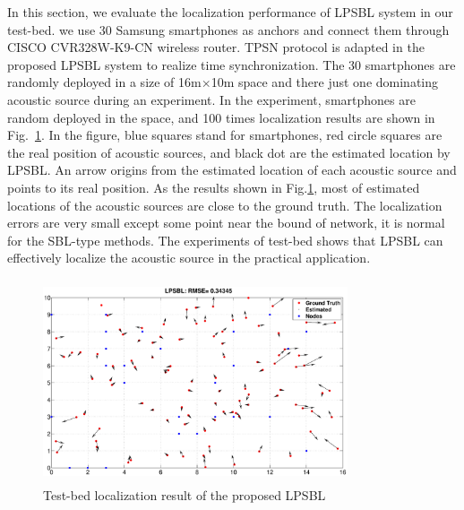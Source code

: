 In this section, we evaluate the localization performance of LPSBL system in our test-bed.
we use 30 Samsung smartphones as anchors and connect them through CISCO CVR328W-K9-CN wireless router. 
TPSN protocol is adapted in the proposed LPSBL system to realize time synchronization.
The 30 smartphones are randomly deployed in a size of 16m$\times$10m space and there just one dominating acoustic source during an experiment.
In the experiment, smartphones are random deployed in the space, and 100 times localization results are shown in Fig.~\ref{fig7}. 
In the figure, blue squares stand for smartphones, red circle squares are the real position of acoustic sources, and black dot are the estimated location by LPSBL. 
An arrow origins from the estimated location of each acoustic source and points to its real position. 
As the results shown in Fig.\ref{fig7}, most of estimated locations of the acoustic sources are close to the ground truth.
The localization errors are very small except some point near the bound of network, it is normal for the SBL-type methods.
The experiments of test-bed shows that LPSBL can effectively localize the acoustic source in the practical application.
  \begin{figure}[htb]
            \includegraphics[height=6cm,width=9.0cm]{image/emulation.eps}
             \caption{Test-bed localization result of the proposed LPSBL}
             \vspace{-5mm}
             \label{fig7}
        \end{figure}
